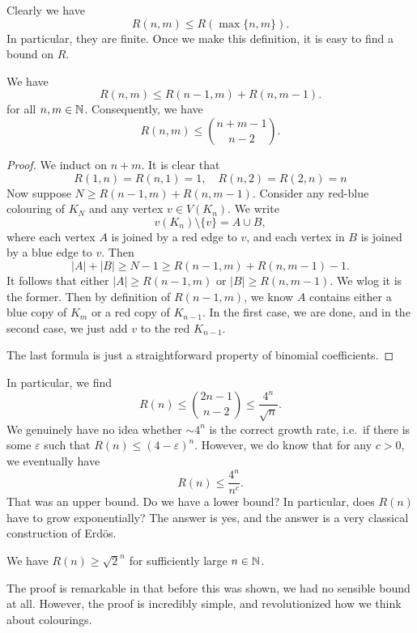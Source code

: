 \documentclass[a4paper]{article}
\begin{document}
Clearly we have
\[
  R(n, m) \leq R(\max\{n, m\}).
\]
In particular, they are finite. Once we make this definition, it is easy to find a bound on $R$.
\begin{thm}
  We have
  \[
    R(n, m) \leq R(n - 1, m) + R(n, m - 1).
  \]
  for all $n, m \in \mathbb{N}$. Consequently, we have
  \[
    R(n, m) \leq \binom{n + m - 1}{n - 2}.
  \]
\end{thm}

\begin{proof}
  We induct on $n + m$. It is clear that
  \[
    R(1, n) = R(n, 1) = 1,\quad R(n, 2) = R(2, n) = n
  \]
  Now suppose $N \geq R(n - 1, m) + R(n, m - 1)$. Consider any red-blue colouring of $K_N$ and any vertex $v \in V(K_n)$. We write
  \[
    v(K_n) \setminus \{v\} = A \cup B,
  \]
  where each vertex $A$ is joined by a red edge to $v$, and each vertex in $B$ is joined by a blue edge to $v$. Then
  \[
    |A| + |B| \geq N - 1 \geq R(n - 1, m) + R(n, m - 1) - 1.
  \]
  It follows that either $|A| \geq R(n - 1, m)$ or $|B| \geq R(n, m - 1)$. We wlog it is the former. Then by definition of $R(n - 1, m)$, we know $A$ contains either a blue copy of $K_m$ or a red copy of $K_{n - 1}$. In the first case, we are done, and in the second case, we just add $v$ to the red $K_{n - 1}$.

  The last formula is just a straightforward property of binomial coefficients.
\end{proof}

In particular, we find
\[
  R(n) \leq \binom{2n - 1}{n - 2} \leq \frac{4^n}{\sqrt{n}}.
\]
We genuinely have no idea whether $\sim 4^n$ is the correct growth rate, i.e.\ if there is some $\varepsilon$ such that $R(n) \leq (4 - \varepsilon)^n$. However, we do know that for any $c > 0$, we eventually have
\[
  R(n) \leq \frac{4^n}{n^c}.
\]
That was an upper bound. Do we have a lower bound? In particular, does $R(n)$ have to grow exponentially? The answer is yes, and the answer is a very classical construction of Erd\"os.

\begin{thm}
  We have $R(n) \geq \sqrt{2}^n$ for sufficiently large $n \in \mathbb{N}$.
\end{thm}
The proof is remarkable in that before this was shown, we had no sensible bound at all. However, the proof is incredibly simple, and revolutionized how we think about colourings.
\end{document}
